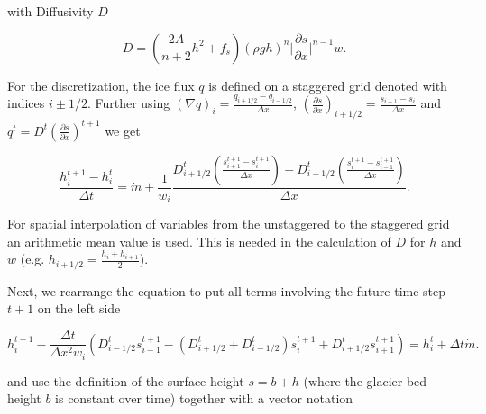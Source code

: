\documentclass[journal abbreviation, manuscript]{copernicus}
\begin{document}
\noindent with Diffusivity $D$

\begin{equation}
    D = \left(\frac{2 A}{n + 2} h^2 + f_s \right) (\rho g h)^n \lvert \frac{\partial s}{\partial x} \rvert^{n - 1} w.
\end{equation}

For the discretization, the ice flux $q$ is defined on a staggered grid denoted with indices $i \pm 1/2$. Further using $(\nabla q)_i = \frac{q_{i+1/2} - q_{i-1/2}}{\Delta x}$, $\left(\frac{\partial s}{\partial x}\right)_{i+1/2} = \frac{s_{i+1} - s_i}{\Delta x}$ and $q^t = D^t \left(\frac{\partial s}{\partial x}\right)^{t+1}$ we get

\begin{equation}
    \frac{h_{i}^{t+1} - h_{i}^{t}}{\Delta t} = \Dot{m} + \frac{1}{w_i}\frac{D_{i+1/2}^{t} \left(\frac{s_{i+1}^{t+1} - s_{i}^{t+1}}{\Delta x}\right) - D_{i-1/2}^{t} \left(\frac{s_{i}^{t+1} - s_{i-1}^{t+1}}{\Delta x}\right)}{\Delta x}.
\end{equation}

\noindent For spatial interpolation of variables from the unstaggered to the staggered grid an arithmetic mean value is used. This is needed in the calculation of $D$ for $h$ and $w$  (e.g. $h_{i+1/2} = \frac{h_i + h_{i+1}}{2}$).

Next, we rearrange the equation to put all terms involving the future time-step $t+1$ on the left side

\begin{equation}
    h_{i}^{t+1} -  \frac{\Delta t}{\Delta x^2 w_i}\left(D_{i-1/2}^{t} s_{i-1}^{t+1} - (D_{i+1/2}^{t} + D_{i-1/2}^{t}) s_{i}^{t+1} + D_{i+1/2}^{t} s_{i+1}^{t+1}\right) = h_{i}^{t} + \Delta t \Dot{m}.
\end{equation}

\noindent and use the definition of the surface height $s=b+h$ (where the glacier bed height $b$ is constant over time) together with a vector notation
\end{document}
